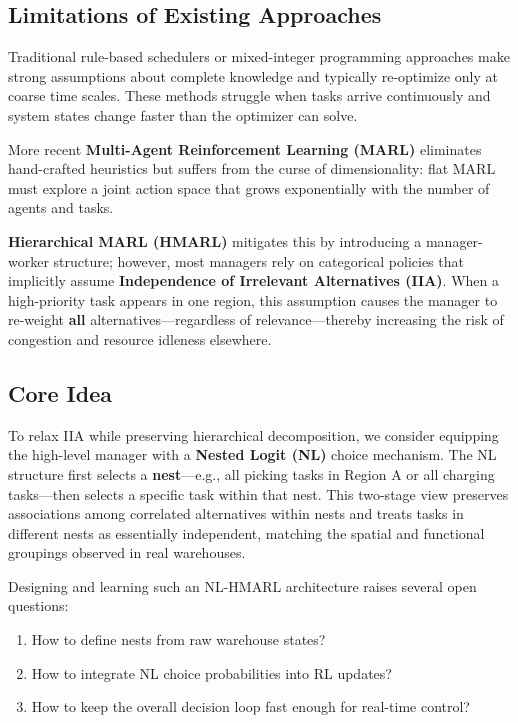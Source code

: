\documentclass[12pt,a4paper]{article}
\begin{document}
\subsection{Limitations of Existing Approaches}

Traditional rule-based schedulers or mixed-integer programming approaches make strong assumptions about complete knowledge and typically re-optimize only at coarse time scales. These methods struggle when tasks arrive continuously and system states change faster than the optimizer can solve.

More recent \textbf{Multi-Agent Reinforcement Learning (MARL)} eliminates hand-crafted heuristics but suffers from the curse of dimensionality: flat MARL must explore a joint action space that grows exponentially with the number of agents and tasks.

\textbf{Hierarchical MARL (HMARL)} mitigates this by introducing a manager-worker structure; however, most managers rely on categorical policies that implicitly assume \textbf{Independence of Irrelevant Alternatives (IIA)}. When a high-priority task appears in one region, this assumption causes the manager to re-weight \textbf{all} alternatives---regardless of relevance---thereby increasing the risk of congestion and resource idleness elsewhere.

\subsection{Core Idea}

To relax IIA while preserving hierarchical decomposition, we consider equipping the high-level manager with a \textbf{Nested Logit (NL)} choice mechanism. The NL structure first selects a \textbf{nest}---e.g., all picking tasks in Region A or all charging tasks---then selects a specific task within that nest. This two-stage view preserves associations among correlated alternatives within nests and treats tasks in different nests as essentially independent, matching the spatial and functional groupings observed in real warehouses.

Designing and learning such an NL-HMARL architecture raises several open questions:
\begin{enumerate}
\item How to define nests from raw warehouse states?
\item How to integrate NL choice probabilities into RL updates?
\item How to keep the overall decision loop fast enough for real-time control?
\end{enumerate}
\end{document}
